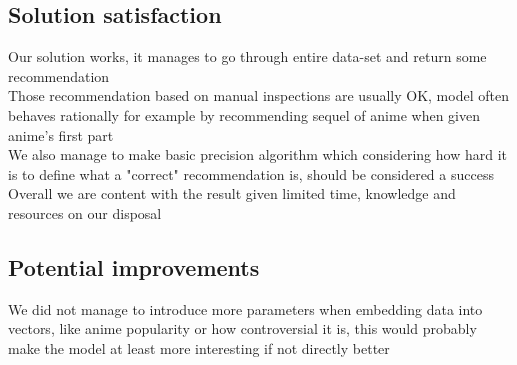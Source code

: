 \documentclass[12pt]{article}
\begin{document}
\subsection{Solution satisfaction}
Our solution works, it manages to go through entire data-set and return some recommendation \\ 
Those recommendation based on manual inspections are usually OK, model often behaves rationally for example by recommending sequel of anime when given anime's first part \\ 
We also manage to make basic precision algorithm which considering how hard it is to define what a "correct" recommendation is, should be considered a success \\ 
Overall we are content with the result given limited time, knowledge and resources on our disposal
\subsection{Potential improvements}
We did not manage to introduce more parameters when embedding data into vectors, like anime popularity or how controversial it is, this would probably make the model at least more interesting if not directly better
\end{document}
